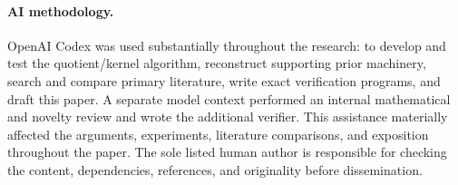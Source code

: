 \documentclass[manuscript,screen,nonacm,11pt]{acmart}
\begin{document}
\paragraph{AI methodology.}
OpenAI Codex was used substantially throughout the research: to develop and
test the quotient/kernel algorithm, reconstruct supporting prior machinery,
search and compare primary literature, write exact verification programs,
and draft this paper. A separate model context performed an internal
mathematical and novelty review and wrote the additional verifier. This
assistance materially affected the arguments, experiments, literature
comparisons, and exposition throughout the paper. The sole listed human
author is responsible for checking the content, dependencies, references,
and originality before dissemination.



\end{document}
